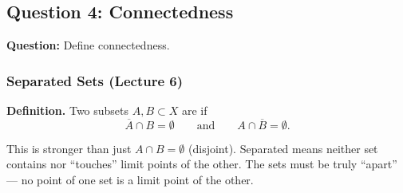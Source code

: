 \documentclass[../master/master.tex]{subfiles}
\begin{document}
\newpage
\subsection{Question 4: Connectedness}

\begin{summarybox}
\textbf{Question:} Define connectedness.
\end{summarybox}

\subsubsection*{Separated Sets (Lecture 6)}

\textbf{Definition.} Two subsets $A, B \subset X$ are  if
\[
\overline{A} \cap B = \emptyset \qquad \text{and} \qquad A \cap \overline{B} = \emptyset.
\]

This is stronger than just $A \cap B = \emptyset$ (disjoint). Separated means neither set contains nor ``touches'' limit points of the other. The sets must be truly ``apart'' --- no point of one set is a limit point of the other.
\end{document}
